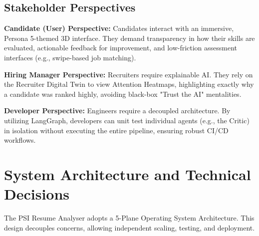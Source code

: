 \documentclass[10pt,journal,compsoc]{IEEEtran}
\begin{document}
\subsection{Stakeholder Perspectives}
\textbf{Candidate (User) Perspective:} Candidates interact with an immersive, Persona 5-themed 3D interface. They demand transparency in how their skills are evaluated, actionable feedback for improvement, and low-friction assessment interfaces (e.g., swipe-based job matching).

\textbf{Hiring Manager Perspective:} Recruiters require explainable AI. They rely on the Recruiter Digital Twin to view Attention Heatmaps, highlighting exactly why a candidate was ranked highly, avoiding black-box "Trust the AI" mentalities.

\textbf{Developer Perspective:} Engineers require a decoupled architecture. By utilizing LangGraph, developers can unit test individual agents (e.g., the Critic) in isolation without executing the entire pipeline, ensuring robust CI/CD workflows.

\section{System Architecture and Technical Decisions}
The PSI Resume Analyser adopts a 5-Plane Operating System Architecture. This design decouples concerns, allowing independent scaling, testing, and deployment.
\end{document}
